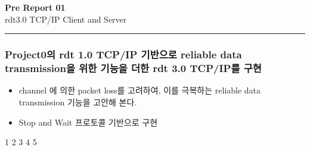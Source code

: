 \documentclass[a4paper]{article}
\begin{document}
\begin{center}\vspace{-1.5cm}
\textbf{\huge Pre Report 01}\\ [0.1cm] 
{\large rdt3.0 TCP/IP Client and Server}\\           

\end{center}
\vspace{-5mm}
\rule{\linewidth}{0.3mm}
\vspace{-3mm}
    \begin{mdframed}[
    backgroundcolor = gray!20 
    ] 
    \vspace{-5mm}
    \begin{center}
        \subsubsection*{Project0의 rdt 1.0 TCP/IP 기반으로 reliable data transmission을 위한 기능을 더한
                        rdt 3.0 TCP/IP를 구현}
            \vspace{-2mm}
            \begin{itemize}
                \item {\small 
                channel 에 의한 packet loss를 고려하여, 이를 극복하는 reliable data transmission 기능을 고안해 본다.
                }
                \vspace{-3mm}
                \item  {\small 
                Stop and Wait 프로토콜 기반으로 구현
                }
            \end{itemize}
        \end{center}
    \end{mdframed}
\vspace{-5mm}


{1}
{2}
{3}
{4}
{5}
\end{document}
